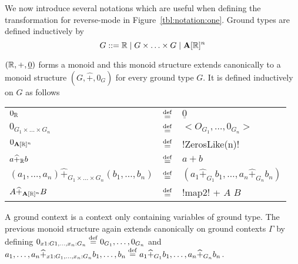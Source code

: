 

\begin{notation}
We now introduce several notations which are useful when defining the transformation for reverse-mode in Figure~\ref{tbl:notation:one}.
Ground types are defined inductively by 
$$G::= \mathbb{R} \mid G\times \ldots \times G \mid \mathbf{A}[\mathbb{R}]^{n}$$

$(\mathbb{R},+,\underline{0})$ forms a monoid and this monoid structure extends canonically 
to a monoid structure $(G,\widehat{+},0_G)$ for every ground type $G$. 
It is defined inductively on $G$ as follows

\begin{tabular}{l c l}
    $0_{\mathbb{R}}$  & $\stackrel {\mathrm{def}}=$ & $\underline{0}$ \\
    $0_{G_1\times \ldots \times G_n}$ & $\stackrel {\mathrm{def}}=$ &  $< O_{G_1},\ldots, 0_{G_n} >$ \\
    $0_{\mathbf{A}[\mathbb{R}]^{n}}$& $\stackrel {\mathrm{def}}=$ & !ZerosLike(n)! \\
    $a\widehat{+}_{\mathbb{R}} b$ & $\stackrel {\mathrm{def}}=$ & $ a+b$ \\
    $(a_1,\ldots,a_n)\widehat{+}_{G_1\times\ldots\times G_n}(b_1,\ldots,b_n)$ & $\stackrel {\mathrm{def}}=$ & $(a_1\widehat{+}_{G_1}b_1,\ldots,a_n\widehat{+}_{G_n}b_n)$ \\
    $A\widehat{+}_{\mathbf{A}[\mathbb{R}]^{n}}B $ & $\stackrel {\mathrm{def}}=$ & !map2! + $A$ $B$ 
\end{tabular}

A ground context is a context only containing variables of ground type.
The previous monoid structure again extends canonically on ground contexts $\Gamma$ by defining
$0_{x1:G1,\ldots,x_n:G_n}\stackrel {\mathrm{def}}= 0_{G_1},\ldots,0_{G_n}$ and 
$a_1,\ldots,a_n\widehat{+}_{x1:G_1,\ldots, x_n:G_n}b_1,\ldots,b_n\stackrel {\mathrm{def}}= a_1\widehat{+}_{G_1}b_1,\ldots,a_n\widehat{+}_{G_n}b_n$.

\end{notation}

